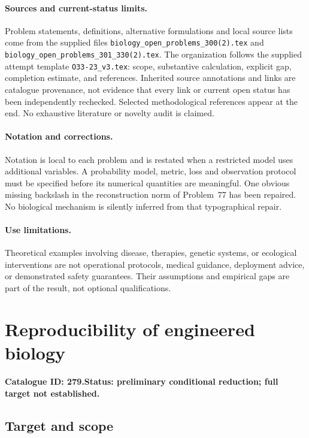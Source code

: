 \documentclass[11pt]{article}
\begin{document}
\paragraph{Sources and current-status limits.}
Problem statements, definitions, alternative formulations and local source lists
come from the supplied files
\texttt{biology\_open\_problems\_300(2).tex} and
\texttt{biology\_open\_problems\_301\_330(2).tex}.
The organization follows the supplied attempt template
\texttt{O33-23\_v3.tex}: scope, substantive calculation, explicit gap,
completion estimate, and references. Inherited source annotations and links are
catalogue provenance, not evidence that every link or current open status has
been independently rechecked. Selected methodological references appear at the
end. No exhaustive literature or novelty audit is claimed.

\paragraph{Notation and corrections.}
Notation is local to each problem and is restated when a restricted model uses
additional variables. A probability model, metric, loss and observation protocol
must be specified before its numerical quantities are meaningful. One obvious
missing backslash in the reconstruction norm of Problem~77 has been repaired.
No biological mechanism is silently inferred from that typographical repair.

\paragraph{Use limitations.}
Theoretical examples involving disease, therapies, genetic systems, or ecological
interventions are not operational protocols, medical guidance, deployment advice,
or demonstrated safety guarantees. Their assumptions and empirical gaps are part
of the result, not optional qualifications.

\setcounter{section}{278}
\section{Reproducibility of engineered biology}
\label{prob:279}
\noindent\textbf{Catalogue ID: 279.}\quad \textbf{Status: preliminary conditional reduction; full target not established.}
\subsection{Target and scope}
\end{document}
